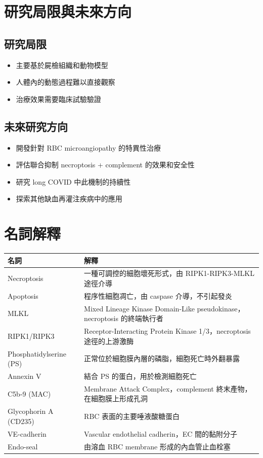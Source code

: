 \documentclass[12pt,a4paper]{article}
\begin{document}
\section{研究局限與未來方向}

\subsection{研究局限}

\begin{itemize}
    \item 主要基於屍檢組織和動物模型
    \item 人體內的動態過程難以直接觀察
    \item 治療效果需要臨床試驗驗證
\end{itemize}

\subsection{未來研究方向}

\begin{itemize}
    \item 開發針對 RBC microangiopathy 的特異性治療
    \item 評估聯合抑制 necroptosis + complement 的效果和安全性
    \item 研究 long COVID 中此機制的持續性
    \item 探索其他缺血再灌注疾病中的應用
\end{itemize}

\section{名詞解釋}

\begin{longtable}{p{5cm}p{9cm}}
\toprule
\textbf{名詞} & \textbf{解釋} \\
\midrule
\endhead
Necroptosis & 一種可調控的細胞壞死形式，由 RIPK1-RIPK3-MLKL 途徑介導 \\
Apoptosis & 程序性細胞凋亡，由 caspase 介導，不引起發炎 \\
MLKL & Mixed Lineage Kinase Domain-Like pseudokinase，necroptosis 的終端執行者 \\
RIPK1/RIPK3 & Receptor-Interacting Protein Kinase 1/3，necroptosis 途徑的上游激酶 \\
Phosphatidylserine (PS) & 正常位於細胞膜內層的磷脂，細胞死亡時外翻暴露 \\
Annexin V & 結合 PS 的蛋白，用於檢測細胞死亡 \\
C5b-9 (MAC) & Membrane Attack Complex，complement 終末產物，在細胞膜上形成孔洞 \\
Glycophorin A (CD235) & RBC 表面的主要唾液酸糖蛋白 \\
VE-cadherin & Vascular endothelial cadherin，EC 間的黏附分子 \\
Endo-seal & 由溶血 RBC membrane 形成的內血管止血栓塞 \\
\bottomrule
\end{longtable}
\end{document}
